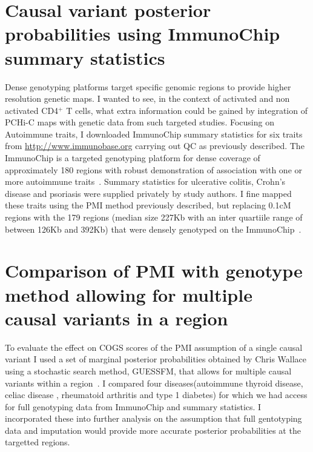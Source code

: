 \documentclass[a4paper,11pt]{report}
\begin{document}
\section{Causal variant posterior probabilities  using ImmunoChip summary statistics}
Dense genotyping platforms target specific genomic regions to provide higher resolution genetic maps. I wanted to see, in the context of activated and non activated CD4$^{+}$ T cells, what extra information could be gained by integration of PCHi-C maps with genetic data from such targeted studies.  Focusing on Autoimmune traits,  I downloaded  ImmunoChip summary statistics for six traits from \url{http://www.immunobase.org} carrying out QC as previously described. The ImmunoChip is a targeted genotyping platform for dense coverage of approximately 180 regions with robust demonstration of association with one or more autoimmune traits~\citep{CortesBrown2011}. Summary statistics for ulcerative colitis, Crohn's disease and psoriasis were supplied privately by study authors. I fine mapped these traits using the PMI method previously described, but replacing 0.1cM regions with the 179 regions (median size 227Kb with an inter quartiile range of between 126Kb and 392Kb) that were densely genotyped on the ImmunoChip~\citep{Onengut-Gumuscu2015-lb}. 

\section{Comparison of PMI with genotype method allowing for multiple causal variants in a region}

To evaluate the effect on COGS scores of the PMI  assumption of a single causal variant I used a set of marginal posterior probabilities obtained by Chris Wallace using a stochastic search method, GUESSFM, that allows for multiple causal variants within a region~\citep{WallaceCutlerPontikosEtAl2015}. I compared  four diseases(autoimmune thyroid disease, celiac disease , rheumatoid arthritis and type 1 diabetes)   for which we had access for full genotyping data from ImmunoChip and summary statistics. I incorporated these into further analysis on the assumption that full gentotyping data and imputation would provide more accurate posterior probabilities at the targetted regions.
\end{document}
